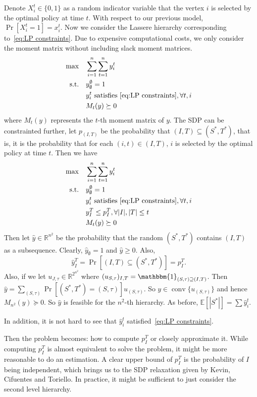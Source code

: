 \documentclass[10pt,leqno]{amsart}
\newcommand{\R}{\mathbb{R}}
\newcommand{\E}{\mathbb{E}}
\DeclareMathOperator{\conv}{conv}
\begin{document}
Denote $X_i^t\in\{0,1\}$ as a random indicator variable that the vertex $i$ is selected by the optimal policy at time $t$.
With respect to our previous model, $\Pr[X_i^t=1]=x_i^t$.
Now we consider the Lassere hierarchy corresponding to~\eqref{eq:LP constraints}.
Due to expensive computational costs, we only consider the moment matrix without including slack moment matrices.
\begin{align*}
  \begin{split}
    \max\quad &\sum_{i=1}^{n}\sum_{t=1}^{n}y^t_i\\
    \text{s.t.}\quad &y_{\emptyset}^{\emptyset}=1\\
    &y_i^t\text{ satisfies~\eqref{eq:LP constraints}},\forall t,i\\
    &M_t(y)\succeq 0
  \end{split}
\end{align*}
where $M_t(y)$ represents the $t$-th moment matrix of $y$.
The SDP can be constrainted further, let $p_{(I,T)}$ be the probability that $(I,T)\subseteq (S^*,T^*)$, that is, it is the probability that for each $(i,t)\in (I,T)$, $i$ is selected by the optimal policy at time $t$.
Then we have
\begin{align*}
  \begin{split}
    \max\quad &\sum_{i=1}^{n}\sum_{t=1}^{n}y^t_i\\
    \text{s.t.}\quad &y_{\emptyset}^{\emptyset}=1\\
    &y_i^t\text{ satisfies~\eqref{eq:LP constraints}},\forall t,i\\
    &y_I^T\leq p_I^T,\forall |I|,|T|\leq t\\
    &M_t(y)\succeq 0
  \end{split}
\end{align*}
Then let $\hat{y}\in\R^{n^2}$ be the probability that the random $(S^*,T^*)$ contains $(I,T)$ as a subsequence.
Clearly, $\hat{y}_{\emptyset}=1$ and $\hat{y}\geq 0$.
Also,
\[\hat{y}_I^T=\Pr[(I,T)\subseteq (S^*,T^*)]=p_I^T.\]
Also, if we let $u_{J,\tau}\in\R^{2^{n^2}}$ where $(u_{S,\tau})_{I,T}=\mathbbm{1}_{(S,\tau)\supseteq (I,T)}$.
Then $\hat{y}=\sum_{(S,\tau)}\Pr[(S^*,T^*)=(S,\tau)]u_{(S,\tau)}$.
So $\hat{y}\in\conv\{u_{(S,\tau)}\}$ and hence $M_{n^2}(y)\succeq 0$. So $\hat{y}$ is feasible for the $n^2$-th hierarchy.
As before, $\E[|S^*|]=\sum\hat{y}_i^t$.

In addition, it is not hard to see that $\hat{y}_i^t$ satisfied~\eqref{eq:LP constraints}.

Then the problem becomes: how to compute $p_I^T$ or closely approximate it.
While computing $p_I^T$ is almost equivalent to solve the problem, it might be more reasonable to do an estimation.
A clear upper bound of $p_I^T$ is the probability of $I$ being independent, which brings us to the SDP relaxation given by Kevin, Cifuentes and Toriello.
In practice, it might be sufficient to just consider the second level hierarchy.
\end{document}
